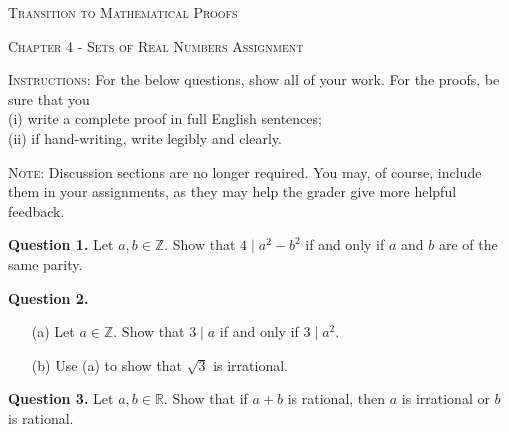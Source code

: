 \documentclass[10pt]{report}
\begin{document}
\begin{center}\textsc{\Large Transition to Mathematical Proofs}

\textsc{\large Chapter 4 - Sets of Real Numbers Assignment}

\bigskip

\end{center}

\noindent\textsc{Instructions:}  For the below questions, show all of your work.  For the proofs, be sure that you \\

\noindent
(i) write a complete proof in full English sentences; \\
(ii) if hand-writing, write legibly and clearly.

\bigskip


\noindent\textsc{Note:}  Discussion sections are no longer required.  You may, of course, include them in your assignments, as they may help the grader give more helpful feedback.  


\bigskip\bigskip


\noindent\textbf{Question 1.}  Let $a,b \in \mathbb Z$.  Show that $4 \mid a^2 - b^2$ if and only if $a$ and $b$ are of the same parity.  

\bigskip

\noindent\textbf{Question 2.}

\begin{itemize}

\item[(a)]  Let $a \in \mathbb Z$.  Show that $3 \mid a$ if and only if $3 \mid a^2$.  

\item[(b)]  Use (a) to show that $\sqrt 3$ is irrational.  

\end{itemize}

\bigskip

\noindent\textbf{Question 3.}  Let $a,b \in \mathbb R$.  Show that if $a+b$ is rational, then $a$ is irrational or $b$ is rational.  

\bigskip
\end{document}
